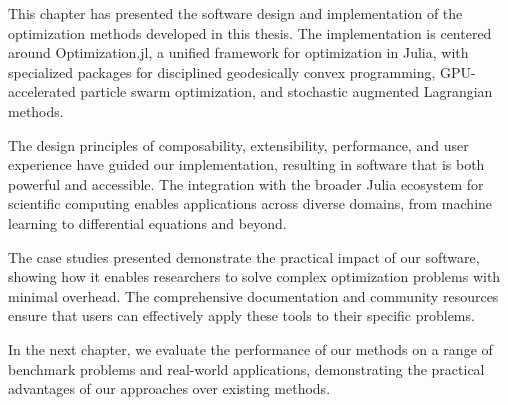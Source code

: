 This chapter has presented the software design and implementation of the optimization methods developed in this thesis. The implementation is centered around Optimization.jl, a unified framework for optimization in Julia, with specialized packages for disciplined geodesically convex programming, GPU-accelerated particle swarm optimization, and stochastic augmented Lagrangian methods.

The design principles of composability, extensibility, performance, and user experience have guided our implementation, resulting in software that is both powerful and accessible. The integration with the broader Julia ecosystem for scientific computing enables applications across diverse domains, from machine learning to differential equations and beyond.

The case studies presented demonstrate the practical impact of our software, showing how it enables researchers to solve complex optimization problems with minimal overhead. The comprehensive documentation and community resources ensure that users can effectively apply these tools to their specific problems.

In the next chapter, we evaluate the performance of our methods on a range of benchmark problems and real-world applications, demonstrating the practical advantages of our approaches over existing methods.